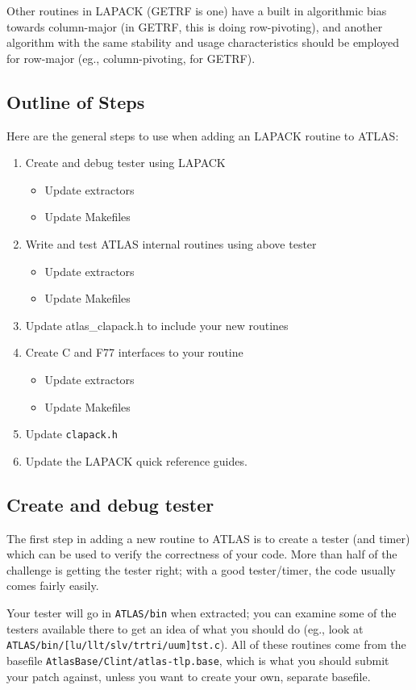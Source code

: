 \documentclass[11pt]{article}
\begin{document}
Other routines in LAPACK (GETRF is one) have a built in algorithmic bias
towards column-major (in GETRF, this is doing row-pivoting), and another
algorithm with the same stability and usage characteristics should be
employed for row-major (eg., column-pivoting, for GETRF).

\subsection{Outline of Steps}
Here are the general steps to use when adding an LAPACK routine to ATLAS:
\begin{enumerate}
\item Create and debug tester using LAPACK
      \begin{itemize}
      \item Update extractors
      \item Update Makefiles
      \end{itemize}
\item Write and test ATLAS internal routines using above tester
      \begin{itemize}
      \item Update extractors
      \item Update Makefiles
      \end{itemize}
\item Update atlas\_clapack.h to include your new routines
\item Create C and F77 interfaces to your routine
      \begin{itemize}
      \item Update extractors
      \item Update Makefiles
      \end{itemize}
\item Update {\tt clapack.h}
\item Update the LAPACK quick reference guides.
\end{enumerate}

\subsection{Create and debug tester}

The first step in adding a new routine to ATLAS is to create a tester
(and timer) which can be used to verify the correctness of your code.
More than half of the challenge is getting the tester right; with a good
tester/timer, the code usually comes fairly easily.

Your tester will go in {\tt ATLAS/bin} when extracted; you can examine
some of the testers available there to get an idea of what you should
do (eg., look at {\tt ATLAS/bin/[lu/llt/slv/trtri/uum]tst.c}).  All of
these routines come from the basefile {\tt AtlasBase/Clint/atlas-tlp.base},
which is what you should submit your patch against, unless you want to create
your own, separate basefile.
\end{document}
